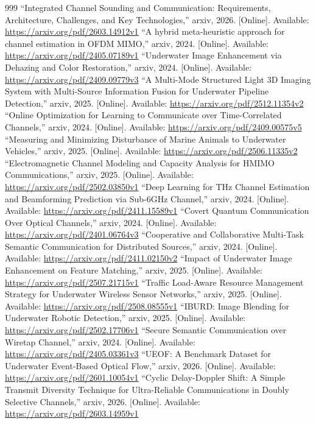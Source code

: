 \documentclass[10pt,journal]{IEEEtran}
\begin{document}
\begin{thebibliography}{999}
 ``Integrated Channel Sounding and Communication: Requirements, Architecture, Challenges, and Key Technologies,'' arxiv, 2026. [Online]. Available: \url{https://arxiv.org/pdf/2603.14912v1}
 ``A hybrid meta-heuristic approach for channel estimation in OFDM MIMO,'' arxiv, 2024. [Online]. Available: \url{https://arxiv.org/pdf/2405.07189v1}
 ``Underwater Image Enhancement via Dehazing and Color Restoration,'' arxiv, 2024. [Online]. Available: \url{https://arxiv.org/pdf/2409.09779v3}
 ``A Multi-Mode Structured Light 3D Imaging System with Multi-Source Information Fusion for Underwater Pipeline Detection,'' arxiv, 2025. [Online]. Available: \url{https://arxiv.org/pdf/2512.11354v2}
 ``Online Optimization for Learning to Communicate over Time-Correlated Channels,'' arxiv, 2024. [Online]. Available: \url{https://arxiv.org/pdf/2409.00575v5}
 ``Measuring and Minimizing Disturbance of Marine Animals to Underwater Vehicles,'' arxiv, 2025. [Online]. Available: \url{https://arxiv.org/pdf/2506.11335v2}
 ``Electromagnetic Channel Modeling and Capacity Analysis for HMIMO Communications,'' arxiv, 2025. [Online]. Available: \url{https://arxiv.org/pdf/2502.03850v1}
 ``Deep Learning for THz Channel Estimation and Beamforming Prediction via Sub-6GHz Channel,'' arxiv, 2024. [Online]. Available: \url{https://arxiv.org/pdf/2411.15589v1}
 ``Covert Quantum Communication Over Optical Channels,'' arxiv, 2024. [Online]. Available: \url{https://arxiv.org/pdf/2401.06764v3}
 ``Cooperative and Collaborative Multi-Task Semantic Communication for Distributed Sources,'' arxiv, 2024. [Online]. Available: \url{https://arxiv.org/pdf/2411.02150v2}
 ``Impact of Underwater Image Enhancement on Feature Matching,'' arxiv, 2025. [Online]. Available: \url{https://arxiv.org/pdf/2507.21715v1}
 ``Traffic Load-Aware Resource Management Strategy for Underwater Wireless Sensor Networks,'' arxiv, 2025. [Online]. Available: \url{https://arxiv.org/pdf/2508.08555v1}
 ``IBURD: Image Blending for Underwater Robotic Detection,'' arxiv, 2025. [Online]. Available: \url{https://arxiv.org/pdf/2502.17706v1}
 ``Secure Semantic Communication over Wiretap Channel,'' arxiv, 2024. [Online]. Available: \url{https://arxiv.org/pdf/2405.03361v3}
 ``UEOF: A Benchmark Dataset for Underwater Event-Based Optical Flow,'' arxiv, 2026. [Online]. Available: \url{https://arxiv.org/pdf/2601.10054v1}
 ``Cyclic Delay-Doppler Shift: A Simple Transmit Diversity Technique for Ultra-Reliable Communications in Doubly Selective Channels,'' arxiv, 2026. [Online]. Available: \url{https://arxiv.org/pdf/2603.14959v1}

\end{thebibliography}
\end{document}
